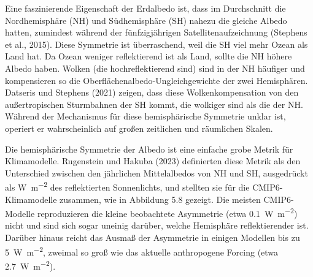 \documentclass[12pt,paper=a4,DIV=12,parskip=never,chapterprefix=false,headings=standardclasses]{scrreprt}
\begin{document}
Eine faszinierende Eigenschaft der Erdalbedo ist, dass im Durchschnitt die Nordhemisphäre (NH) und Südhemisphäre (SH) nahezu die gleiche Albedo hatten, zumindest während der fünfzigjährigen Satellitenaufzeichnung (Stephens et al., 2015). Diese Symmetrie ist überraschend, weil die SH viel mehr Ozean als Land hat. Da Ozean weniger reflektierend ist als Land, sollte die NH höhere Albedo haben. Wolken (die hochreflektierend sind) sind in der NH häufiger und kompensieren so die Oberflächenalbedo-Ungleichgewichte der zwei Hemisphären. Datseris und Stephens (2021) zeigen, dass diese Wolkenkompensation von den außertropischen Sturmbahnen der SH kommt, die wolkiger sind als die der NH. Während der Mechanismus für diese hemisphärische Symmetrie unklar ist, operiert er wahrscheinlich auf großen zeitlichen und räumlichen Skalen.

Die hemisphärische Symmetrie der Albedo ist eine einfache grobe Metrik für Klimamodelle. Rugenstein und Hakuba (2023) definierten diese Metrik als den Unterschied zwischen den jährlichen Mittelalbedos von NH und SH, ausgedrückt als \si{\watt\per\square\meter} des reflektierten Sonnenlichts, und stellten sie für die CMIP6-Klimamodelle zusammen, wie in Abbildung 5.8 gezeigt. Die meisten CMIP6-Modelle reproduzieren die kleine beobachtete Asymmetrie (etwa \SI{0.1}{\watt\per\square\meter}) nicht und sind sich sogar uneinig darüber, welche Hemisphäre reflektierender ist. Darüber hinaus reicht das Ausmaß der Asymmetrie in einigen Modellen bis zu \SI{5}{\watt\per\square\meter}, zweimal so groß wie das aktuelle anthropogene Forcing (etwa \SI{2.7}{\watt\per\square\meter}).
\end{document}
